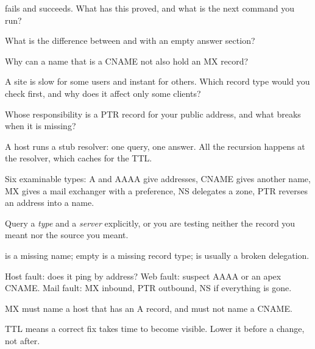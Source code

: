 \begin{checkpoint}
\begin{tightnum}
  \item {} fails and  succeeds.
        What has this proved, and what is the next command you run?
  \item What is the difference between  and  with an
        empty answer section?
  \item Why can a name that is a CNAME not also hold an MX record?
  \item A site is slow for some users and instant for others. Which record type
        would you check first, and why does it affect only some clients?
  \item Whose responsibility is a PTR record for your public address, and what
        breaks when it is missing?
\end{tightnum}
\end{checkpoint}

\begin{chaptersummary}
\begin{tight}
  \item A host runs a stub resolver: one query, one answer. All the recursion
        happens at the resolver, which caches for the TTL.
  \item Six examinable types: A and AAAA give addresses, CNAME gives another
        name, MX gives a mail exchanger with a preference, NS delegates a zone,
        PTR reverses an address into a name.
  \item Query a \emph{type} and a \emph{server} explicitly, or you are testing
        neither the record you meant nor the source you meant.
  \item {} is a missing name; empty  is a missing record
        type;  is usually a broken delegation.
  \item Host fault: does it ping by address? Web fault: suspect AAAA or an
        apex CNAME. Mail fault: MX inbound, PTR outbound, NS if everything is
        gone.
  \item MX must name a host that has an A record, and must not name a CNAME.
  \item TTL means a correct fix takes time to become visible. Lower it before a
        change, not after.
\end{tight}
\end{chaptersummary}

